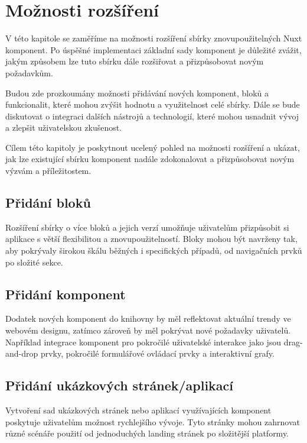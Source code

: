 
\chapter{Možnosti rozšíření}

V této kapitole se zaměříme na možnosti rozšíření sbírky znovupoužitelných Nuxt komponent. Po úspěšné implementaci základní sady komponent je důležité zvážit, jakým způsobem lze tuto sbírku dále rozšiřovat a přizpůsobovat novým požadavkům.

Budou zde prozkoumány možnosti přidávání nových komponent, bloků a funkcionalit, které mohou zvýšit hodnotu a využitelnost celé sbírky. Dále se bude diskutovat o integraci dalších nástrojů a technologií, které mohou usnadnit vývoj a zlepšit uživatelskou zkušenost.

Cílem této kapitoly je poskytnout ucelený pohled na možnosti rozšíření a ukázat, jak lze existující sbírku komponent nadále zdokonalovat a přizpůsobovat novým výzvám a příležitostem.


\section{Přidání bloků}
Rozšíření sbírky o více bloků a jejich verzí umožňuje uživatelům přizpůsobit si aplikace s větší flexibilitou a znovupoužitelností. Bloky mohou být navrženy tak, aby pokrývaly širokou škálu běžných i specifických případů, od navigačních prvků po složité sekce.

\section{Přidání komponent}
Dodatek nových komponent do knihovny by měl reflektovat aktuální trendy ve webovém designu, zatímco zároveň by měl pokrývat nové požadavky uživatelů. Například integrace komponent pro pokročilé uživatelské interakce jako jsou drag-and-drop prvky, pokročilé formulářové ovládací prvky a interaktivní grafy.

\section{Přidání ukázkových stránek/aplikací}
Vytvoření sad ukázkových stránek nebo aplikací využívajících komponent poskytuje uživatelům možnost rychlejšího vývoje. Tyto stránky mohou zahrnovat různé scénáře použití od jednoduchých landing stránek po složitější platformy.

